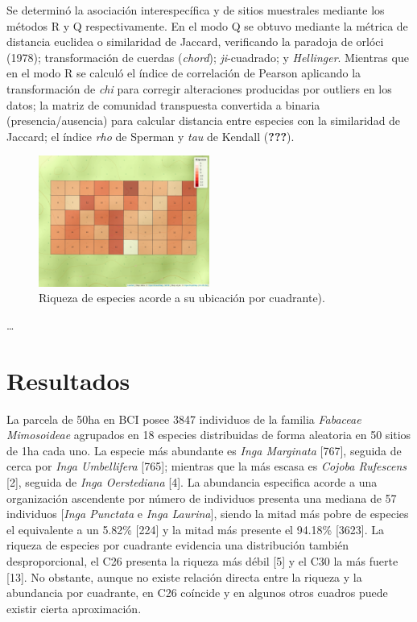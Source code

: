 \documentclass[11pt,]{article}
\begin{document}
Se determinó la asociación interespecífica y de sitios muestrales
mediante los métodos R y Q respectivamente. En el modo Q se obtuvo
mediante la métrica de distancia euclidea o similaridad de Jaccard,
verificando la paradoja de orlóci (1978); transformación de cuerdas
(\emph{chord}); \emph{ji}-cuadrado; y \emph{Hellinger}. Mientras que en
el modo R se calculó el índice de correlación de Pearson aplicando la
transformación de \emph{chi} para corregir alteraciones producidas por
outliers en los datos; la matriz de comunidad transpuesta convertida a
binaria (presencia/ausencia) para calcular distancia entre especies con
la similaridad de Jaccard; el índice \emph{rho} de Sperman y \emph{tau}
de Kendall ({\textbf{???}}).

\begin{figure}
\centering
\includegraphics[width=0.50000\textwidth]{mapa_cuadros_riq_mi_familia.png}
\caption{Riqueza de especies acorde a su ubicación por cuadrante).}
\end{figure}

\ldots

\section{Resultados}\label{resultados}

La parcela de 50ha en BCI posee 3847 individuos de la familia
\emph{Fabaceae Mimosoideae} agrupados en 18 especies distribuidas de
forma aleatoria en 50 sitios de 1ha cada uno. La especie más abundante
es \emph{Inga Marginata} {[}767{]}, seguida de cerca por \emph{Inga
Umbellifera} {[}765{]}; mientras que la más escasa es \emph{Cojoba
Rufescens} {[}2{]}, seguida de \emph{Inga Oerstediana} {[}4{]}. La
abundancia especifica acorde a una organización ascendente por número de
individuos presenta una mediana de 57 individuos {[}\emph{Inga Punctata}
e \emph{Inga Laurina}{]}, siendo la mitad más pobre de especies el
equivalente a un 5.82\% {[}224{]} y la mitad más presente el 94.18\%
{[}3623{]}. La riqueza de especies por cuadrante evidencia una
distribución también desproporcional, el C26 presenta la riqueza más
débil {[}5{]} y el C30 la más fuerte {[}13{]}. No obstante, aunque no
existe relación directa entre la riqueza y la abundancia por cuadrante,
en C26 coíncide y en algunos otros cuadros puede existir cierta
aproximación.
\end{document}

